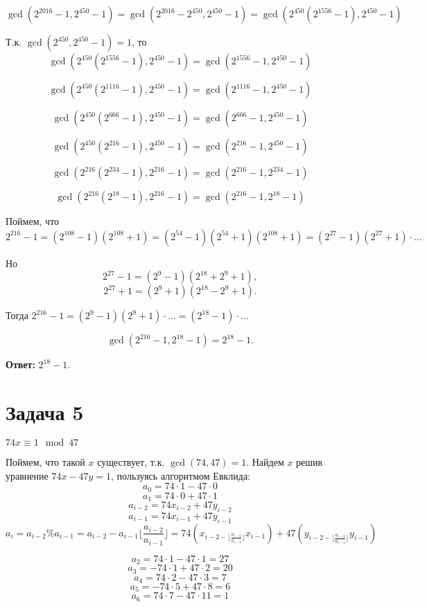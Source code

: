 \documentclass{article}
\begin{document}
	$\gcd(2^{2016} - 1, 2^{450} - 1) = \gcd(2^{2016} - 2^{450}, 2^{450} - 1) = \gcd(2^{450}(2^{1556} - 1), 2^{450} - 1)$
	
	Т.к. $\gcd(2^{450}, 2^{450} - 1) = 1$, 
	то
	$$\gcd(2^{450}(2^{1556} - 1), 2^{450} - 1) = \gcd(2^{1556} - 1, 2^{450} - 1)$$
	
	$$\gcd(2^{450}(2^{1116} - 1), 2^{450} - 1) = \gcd(2^{1116} - 1, 2^{450} - 1)$$
	
	$$\gcd(2^{450}(2^{666} - 1), 2^{450} - 1) = \gcd(2^{666} - 1, 2^{450} - 1)$$
	
	$$\gcd(2^{450}(2^{216} - 1), 2^{450} - 1) = \gcd(2^{216} - 1, 2^{450} - 1)$$
	
	$$\gcd(2^{216}(2^{234} - 1), 2^{216} - 1) = \gcd(2^{216} - 1, 2^{234} - 1)$$
	
	$$\gcd(2^{216}(2^{18} - 1), 2^{216} - 1) = \gcd(2^{216} - 1, 2^{18} - 1)$$
	
	Поймем, что $2^{216} - 1 = (2^{108} - 1)(2^{108} + 1) = (2^{54} - 1)(2^{54} + 1)(2^{108} + 1) = (2^{27} - 1)(2^{27} + 1) \cdot ...$
	
	Но $$2^{27} - 1 = (2^9 - 1)(2^{18} + 2^9 + 1),$$ $$2^{27} + 1 = (2^9 + 1)(2^{18} - 2^9 + 1).$$ 
	
	Тогда $2^{216} - 1 = (2^9 - 1)(2^9 + 1) \cdot ... = (2^{18} - 1)\cdot ...$
	
	$$\gcd(2^{216} - 1, 2^{18} - 1) = 2^{18} - 1.$$
	
	\textbf{Ответ:} $2^{18} - 1.$
	
	\section{Задача 5}
	
	$74x \equiv 1 \mod 47$
	
	Поймем, что такой $x$ существует, т.к. $\gcd(74, 47) = 1$.
	Найдем $x$ решив уравнение $74x - 47y = 1$, пользуясь алгоритмом Евклида:
	$$a_0 = 74 \cdot 1 - 47 \cdot 0$$  
	$$a_1 = 74 \cdot 0 + 47 \cdot 1  $$ 
	$$a_{i - 2} = 74x_{i - 2} + 47y_{i - 2}$$ 
	$$a_{i - 1} = 74x_{i - 1} + 47y_{i - 1}$$ 
	$$a_i = a_{i - 2} \% a_{i - 1} = 
	a_{i - 2} - a_{i - 1}\lfloor\frac{a_{i-2}}{a_{i - 1}}\rfloor =
	74(x_{i - 2 - \lfloor\frac{a_{i-2}}{a_{i - 1}}\rfloor }x_{i - 1}) + 47(y_{i - 2 - \lfloor\frac{a_{i-2}}{a_{i - 1}}\rfloor }y_{i - 1})$$  
	
	$$a_2 = 74 \cdot 1 - 47\cdot1 = 27$$
	$$a_3 = -74 \cdot 1 + 47\cdot2 = 20$$
	$$a_4 = 74 \cdot 2 - 47\cdot3 = 7$$
	$$a_5 = -74 \cdot 5 + 47\cdot 8 = 6$$
	$$a_6 = 74 \cdot 7 - 47\cdot 11 = 1$$
	
\end{document}
